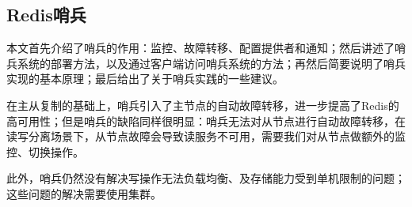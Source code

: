 \documentclass[../../../interview-questions.tex]{subfiles}
\begin{document}
\subsection{Redis哨兵}

本文首先介绍了哨兵的作用：监控、故障转移、配置提供者和通知；然后讲述了哨兵系统的部署方法，以及通过客户端访问哨兵系统的方法；再然后简要说明了哨兵实现的基本原理；最后给出了关于哨兵实践的一些建议。

在主从复制的基础上，哨兵引入了主节点的自动故障转移，进一步提高了Redis的高可用性；但是哨兵的缺陷同样很明显：哨兵无法对从节点进行自动故障转移，在读写分离场景下，从节点故障会导致读服务不可用，需要我们对从节点做额外的监控、切换操作。

此外，哨兵仍然没有解决写操作无法负载均衡、及存储能力受到单机限制的问题；这些问题的解决需要使用集群。
\end{document}
